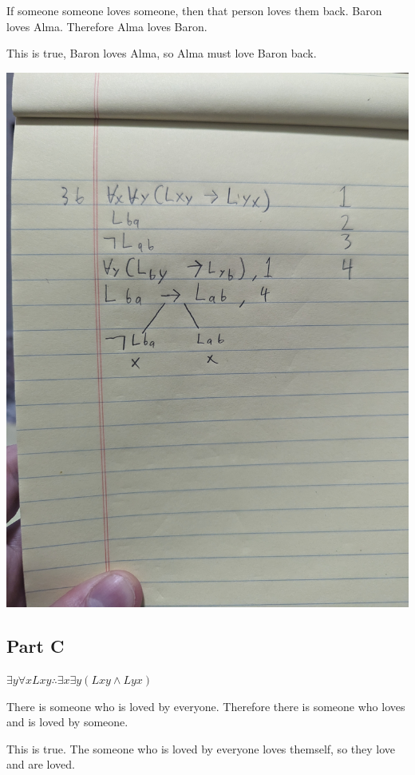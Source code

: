 \documentclass[12pt]{article}
\begin{document}
If someone someone loves someone, then that person loves them back. Baron loves Alma. Therefore Alma loves Baron.

This is true, Baron loves Alma, so Alma must love Baron back. 

\includegraphics[width=\textwidth]{3b}

\subsection*{Part C}
$\exists y \forall x Lxy \therefore \exists x \exists y(Lxy \land Lyx)$

There is someone who is loved by everyone. Therefore there is someone who loves and is loved by someone.

This is true. The someone who is loved by everyone loves themself, so they love and are loved. 
\end{document}
